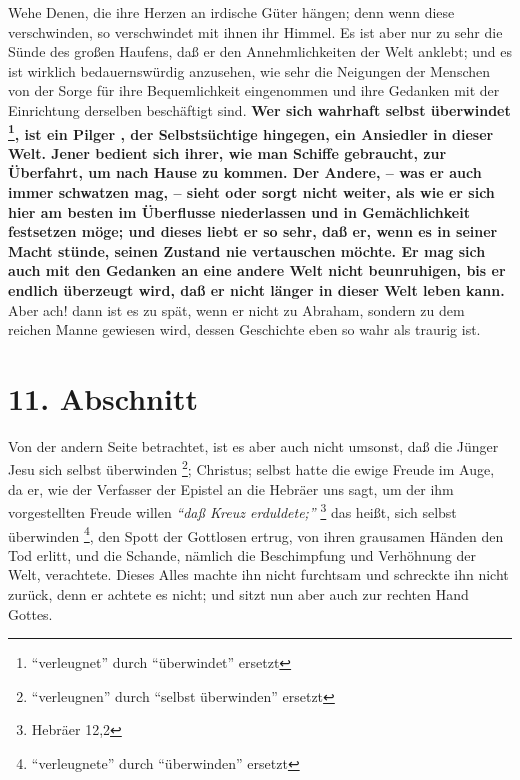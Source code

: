  Wehe Denen, die ihre Herzen an irdische Güter hängen; denn
wenn diese
verschwinden, so verschwindet mit ihnen ihr Himmel.  Es ist
aber nur zu sehr die
Sünde des großen Haufens, daß er den Annehmlichkeiten der Welt anklebt; und es
ist wirklich bedauernswürdig anzusehen, wie sehr die Neigungen der Menschen von
der Sorge für ihre Bequemlichkeit eingenommen und ihre Gedanken mit der
Einrichtung derselben beschäftigt sind. \textbf{Wer sich wahrhaft selbst
überwindet \footnote{"`verleugnet"' durch "`überwindet"' ersetzt}, ist
ein Pilger , der Selbstsüchtige hingegen, ein Ansiedler in dieser
Welt. Jener
bedient sich ihrer, wie man Schiffe gebraucht, zur Überfahrt, um nach Hause zu
kommen. Der Andere, -- was er auch immer schwatzen mag, -- sieht oder sorgt
nicht weiter, als wie er sich hier am besten im Überflusse niederlassen und in
Gemächlichkeit festsetzen möge; und dieses liebt er so sehr, daß er, wenn es in
seiner Macht stünde, seinen Zustand nie vertauschen möchte. Er mag sich auch mit
den Gedanken an eine andere Welt nicht beunruhigen, bis er endlich überzeugt
wird, daß er nicht länger in dieser Welt leben kann.} Aber ach! dann ist es zu
spät, wenn er nicht zu Abraham, sondern zu dem reichen Manne gewiesen wird,
dessen Geschichte eben so wahr als traurig ist.

\section{11. Abschnitt} \label{kap4_ab11}

Von der andern Seite betrachtet, ist es aber auch nicht umsonst, daß die Jünger
Jesu sich selbst überwinden \footnote{"`verleugnen"' durch "`selbst überwinden"'
ersetzt}; Christus; selbst hatte die ewige Freude im Auge, da er,
wie der Verfasser der Epistel an die Hebräer uns sagt, um der ihm vorgestellten
Freude willen
\textit{"`daß Kreuz erduldete;"'}
\footnote{Hebräer 12,2}
das heißt, sich
selbst überwinden \footnote{"`verleugnete"' durch "`überwinden"' ersetzt}, den
Spott der Gottlosen ertrug, von ihren grausamen Händen
den Tod erlitt, und die Schande, nämlich die Beschimpfung und Verhöhnung der
Welt, verachtete. Dieses Alles machte ihn nicht furchtsam und schreckte ihn
nicht zurück, denn er achtete es nicht; und sitzt nun aber auch zur rechten Hand
Gottes.

\medskip

